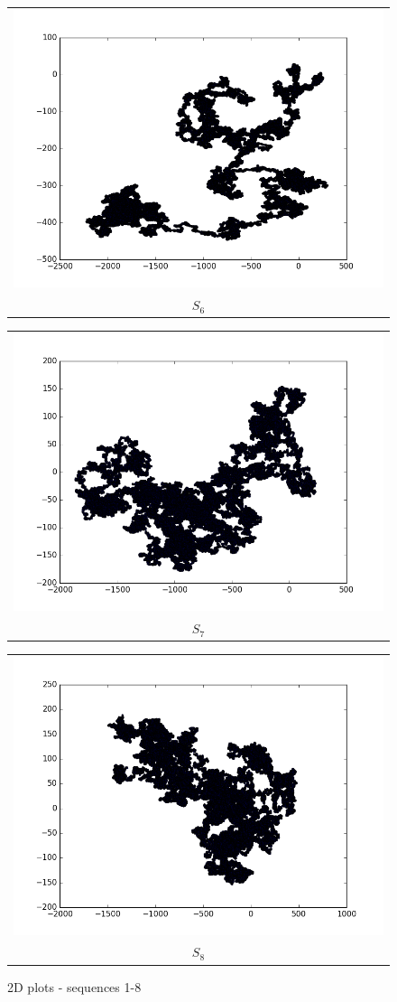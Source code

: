\documentclass[10pt,twocolumn]{article}
\makeatletter
\newcommand{\subsubfloat}[2]{%
  \begin{tabular}{@{}c@{}}#1\\#2\end{tabular}%
}
\makeatother
\begin{document}
\begin{figure}
{\begin{minipage}{\columnwidth}
  \qquad
  \subsubfloat{\includegraphics[width=0.45\columnwidth]{f_shape_6}}{$S_6$}
  \qquad
  \subsubfloat{\includegraphics[width=0.45\columnwidth]{f_shape_7}}{$S_7$}
  \qquad
  \subsubfloat{\includegraphics[width=0.45\columnwidth]{f_shape_8}}{$S_8$}

  \end{minipage}
}

\caption{2D plots - sequences 1-8}
\end{figure}
\end{document}
